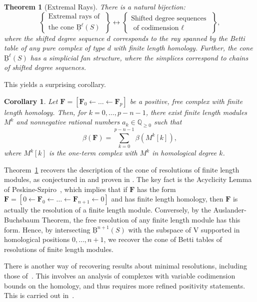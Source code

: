 \documentclass[12pt]{amsart}
\newtheorem{cor}[lemma]{Corollary}
\newtheorem{thm}[lemma]{Theorem}
\theoremstyle{definition}
\theoremstyle{remark}
\newcommand{\QQ}{\mathbb{Q}}
\newcommand{\VV}{\mathrm{V}}
\newcommand{\FF}{\mathbf{F}}
\newcommand{\BBQ}{\underline{\mathrm{B}}}
\begin{document}
\begin{thm}[Extremal Rays]\label{thm:extremal rays}
There is a natural bijection:
\[
\left\{
\begin{matrix}
\text{Extremal rays of }\\
\text{the cone } \BBQ^{\ell}(S)
\end{matrix}
\right\}
\longleftrightarrow
\left\{
\begin{matrix}
\text{Shifted degree sequences }\\
\text{ of codimension $\ell$}
\end{matrix}
\right\},
\]
where the shifted degree sequence $d$ corresponds to the ray spanned by the Betti table of any pure complex of type $d$ with finite length homology.  Further, the cone $\BBQ^{\ell}(S)$ has a simplicial fan structure, where the simplices correspond to chains of shifted degree sequences.
\end{thm}

This yields a surprising corollary.
\begin{cor}
Let $\FF=[\FF_0\gets \dots \gets \FF_p]$ be a positive, free complex with finite length homology.  Then, for $k=0, \dots, p-n-1$, there exist finite length modules $M^k$ and nonnegative rational numbers $a_k\in \QQ_{\geq 0}$ such that
\[
\beta(\FF)=\sum_{k=0}^{p-n-1} \beta(M^k[k]),
\]
where $M^k[k]$ is the one-term complex with $M^k$ in homological degree $k$.
\end{cor}

Theorem~\ref{thm:extremal rays} recovers the description of the cone of resolutions of finite length modules, as conjectured in \cite[Conjecture~2.4]{boij-sod1} and proven in \cite[Theorems~0.1 and 0.2]{eis-schrey1}.  The key fact is the Acyclicity Lemma of Peskine-Szpiro~\cite[Lemme~1.8]{peskine-szpiro}, which implies that if $\FF$ has the form $\FF=[0\gets \FF_0\gets \dots \gets \FF_{n+1}\gets 0]$ and has finite length homology, then $\FF$ is actually the resolution of a finite length module.  Conversely, by the Auslander-Buchsbaum Theorem, the free resolution of any finite length module has this form.  Hence, by intersecting $\BBQ^{n+1}(S)$ with the subspace of $\VV$ supported in homological positions $0, \dots, n+1$, we recover the cone of Betti tables of resolutions of finite length modules.

There is another way of recovering results about minimal resolutions, including those of~\cite{boij-sod2}.  This involves an analysis of complexes with variable codimension bounds on the homology, and thus requires more refined positivity statements.  This is carried out in~\cite{eis-erm-refined}.
\end{document}
